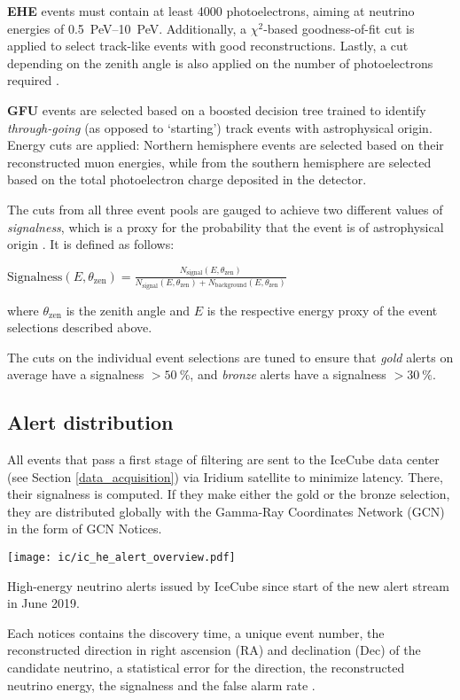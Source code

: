 \textbf{EHE} events must contain at least 4000 photoelectrons, aiming at neutrino energies of \SIrange{0.5}{10}{\peta\eV}. Additionally, a $\chi^2$-based goodness-of-fit cut is applied to select track-like events with good reconstructions. Lastly, a cut depending on the zenith angle is also applied on the number of photoelectrons required \cite{Tung2019}.

\textbf{GFU} events are selected based on a boosted decision tree trained to identify \textit{through-going} (as opposed to `starting') track events with astrophysical origin. Energy cuts are applied: Northern hemisphere events are selected based on their reconstructed muon energies, while from the southern hemisphere are selected based on the total photoelectron charge deposited in the detector.

The cuts from all three event pools are gauged to achieve two different values of \textit{signalness}, which is a proxy for the probability that the event is of astrophysical origin \cite{Tung2019}. It is defined as follows:
\begin{definition}\label{signalness_def}
$\text{Signalness}(E,\theta_\text{zen}) = \frac{N_\text{signal}(E,\theta_\text{zen})}{N_\text{signal}(E,\theta_\text{zen})+N_\text{background}(E,\theta_\text{zen})}$
\end{definition}
where $\theta_\text{zen}$ is the zenith angle and $E$ is the respective energy proxy of the event selections described above.

The cuts on the individual event selections are tuned to ensure that \textit{gold} alerts on average have a signalness $>\SI{50}{\percent}$, and \textit{bronze} alerts have a signalness $>\SI{30}{\percent}$.
\subsection{Alert distribution} \label{ic_alerts}
All events that pass a first stage of filtering are sent to the IceCube data center (see Section \ref{data_acquisition}) via Iridium satellite to minimize latency. There, their signalness is computed. If they make either the gold or the bronze selection, they are distributed globally with the Gamma-Ray Coordinates Network (GCN) in the form of GCN Notices.
\begin{marginfigure}
    \texttt{[image: ic/ic\_he\_alert\_overview.pdf]}
    \caption[IceCube alert overview]{High-energy neutrino alerts issued by IceCube since start of the new alert stream in June 2019.}
\end{marginfigure}
Each notices contains the discovery time, a unique event number, the reconstructed direction in right ascension (RA) and declination (Dec) of the candidate neutrino, a statistical error for the direction, the reconstructed neutrino energy, the signalness and the false alarm rate \cite{Tung2019}.

